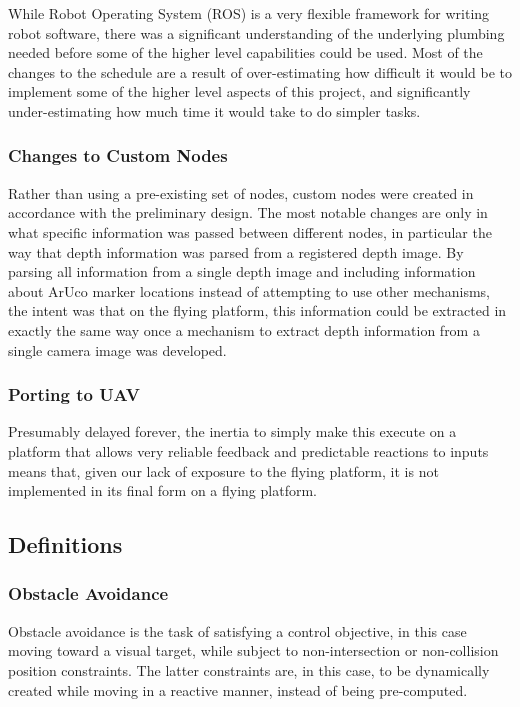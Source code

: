 \documentclass{article}[12]
\begin{document}
	While Robot Operating System (ROS) is a very flexible framework for writing robot software, there was a significant understanding of the underlying plumbing needed before some of the higher level capabilities could be used. Most of the changes to the schedule are a result of over-estimating how difficult it would be to implement some of the higher level aspects of this project, and significantly under-estimating how much time it would take to do simpler tasks.
	
		\subsubsection{Changes to Custom Nodes}
	
	Rather than using a pre-existing set of nodes, custom nodes were created in accordance with the preliminary design. The most notable changes are only in what specific information was passed between different nodes, in particular the way that depth information was parsed from a registered depth image. By parsing all information from a single depth image and including information about ArUco marker locations instead of attempting to use other mechanisms, the intent was that on the flying platform, this information could be extracted in exactly the same way once a mechanism to extract depth information from a single camera image was developed.
	
	\subsubsection{Porting to UAV}
	
	Presumably delayed forever, the inertia to simply make this execute on a platform that allows very reliable feedback and predictable reactions to inputs means that, given our lack of exposure to the flying platform, it is not implemented in its final form on a flying platform. 

	\subsection{Definitions}
	
		\subsubsection{Obstacle Avoidance}
		
		Obstacle avoidance is the task of satisfying a control objective, in this case moving toward a visual target, while subject to non-intersection or non-collision position constraints. The latter constraints are, in this case, to be dynamically created while moving in a reactive manner, instead of being pre-computed.
		
\end{document}
